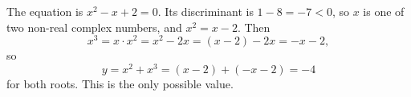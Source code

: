 The equation is $x^2-x+2=0$. Its discriminant is $1-8=-7<0$, so $x$ is one of two non-real complex numbers, and $x^2=x-2$. Then
\[
x^3=x\cdot x^2=x^2-2x=(x-2)-2x=-x-2,
\]
so
\[
y=x^2+x^3=(x-2)+(-x-2)=\boxed{-4}
\]
for both roots. This is the only possible value.
